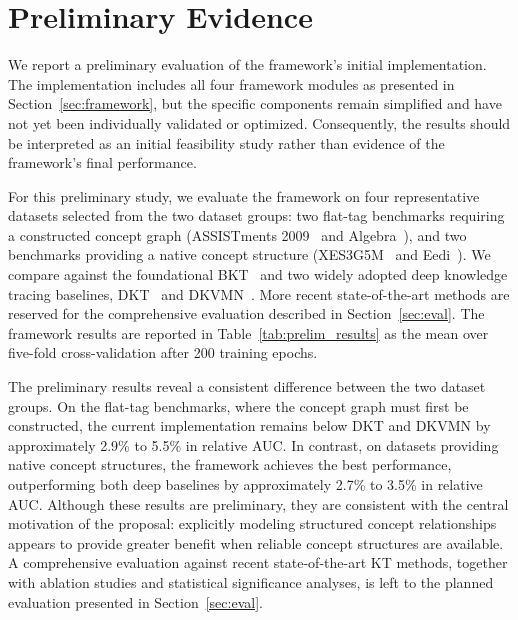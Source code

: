 \documentclass[conference]{IEEEtran}
\begin{document}
\section{Preliminary Evidence}
\label{sec:prelim}

We report a preliminary evaluation of the framework's initial implementation. The implementation includes all four framework modules as presented in Section~\ref{sec:framework}, but the specific components remain simplified and have not yet been individually validated or optimized. Consequently, the results should be interpreted as an initial feasibility study rather than evidence of the framework's final performance.

For this preliminary study, we evaluate the framework on four representative datasets selected from the two dataset groups: two flat-tag benchmarks requiring a constructed concept graph (ASSISTments 2009~\cite{feng2009assistments} and Algebra~\cite{stamper2010kddcup}), and two benchmarks providing a native concept structure (XES3G5M~\cite{liu2023xes3g5m} and Eedi~\cite{wang2021neurips}). We compare against the foundational BKT~\cite{corbett1994kt} and two widely adopted deep knowledge tracing baselines, DKT~\cite{piech2015dkt} and DKVMN~\cite{zhang2017dkvmn}. More recent state-of-the-art methods are reserved for the comprehensive evaluation described in Section~\ref{sec:eval}. The framework results are reported in Table~\ref{tab:prelim_results} as the mean over five-fold cross-validation after 200 training epochs.

The preliminary results reveal a consistent difference between the two dataset groups. On the flat-tag benchmarks, where the concept graph must first be constructed, the current implementation remains below DKT and DKVMN by approximately 2.9\% to 5.5\% in relative AUC. In contrast, on datasets providing native concept structures, the framework achieves the best performance, outperforming both deep baselines by approximately 2.7\% to 3.5\% in relative AUC. Although these results are preliminary, they are consistent with the central motivation of the proposal: explicitly modeling structured concept relationships appears to provide greater benefit when reliable concept structures are available. A comprehensive evaluation against recent state-of-the-art KT methods, together with ablation studies and statistical significance analyses, is left to the planned evaluation presented in Section~\ref{sec:eval}.
\end{document}
